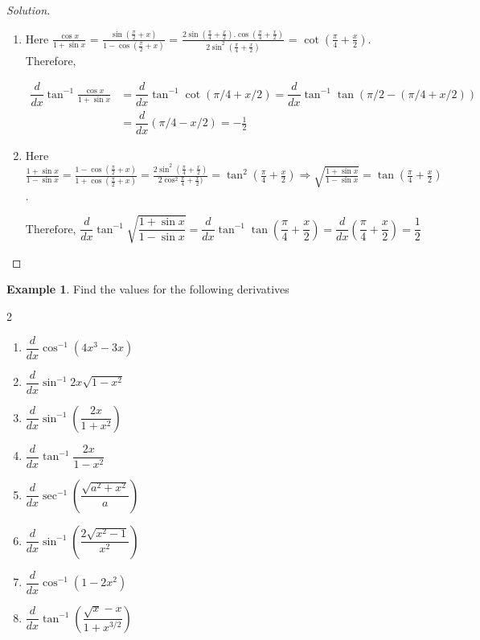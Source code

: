 \documentclass[../../main.tex]{subfiles}
\theoremstyle{definition}
\newtheorem{example}{Example}[section]
\newenvironment{solution}
    {\begin{proof}[Solution]}
    {\end{proof}}
\begin{document}
\begin{solution}
\begin{enumerate}[label=(\roman*)]
\item Here $\frac{\cos x}{1+\sin x}$ = $\frac{\sin (\frac{\pi}{2}+x)}{1-\cos(\frac{\pi}{2}+x)}$ = $\frac{2\sin (\frac{\pi}{4}+\frac{x}{2}).\cos (\frac{\pi}{4}+\frac{x}{2})}{2\sin^2(\frac{\pi}{4}+\frac{x}{2})}$ = $\cot (\frac{\pi}{4}+\frac{x}{2})$. Therefore,

\begin{align*}
\dfrac{d}{dx} \tan^{-1} \frac{\cos x}{1+\sin x} &= \dfrac{d}{dx} \tan^{-1}\cot (\pi/4+x/2) = \dfrac{d}{dx} \tan^{-1}\tan(\pi/2- (\pi/4+x/2)) \\ 
&= \dfrac{d}{dx} (\pi/4-x/2) = -\frac{1}{2}
\end{align*}


\item Here $\frac{1+\sin x}{1-\sin x} = \frac{1-\cos(\frac{\pi}{2}+ x)}{1+\cos (\frac{\pi}{2}+x)} = \frac{2\sin^2(\frac
{\pi}{4}+\frac{x}{2})}{2\cos^2\frac
{\pi}{4}+\frac{x}{2})} = \tan^2(\frac{\pi}{4}+\frac{x}{2}) \Rightarrow \sqrt{\frac{1+\sin x}{1-\sin x}} = \tan (\frac{\pi}{4}+\frac{x}{2})$. 

\[
\text{Therefore, }\dfrac{d}{dx} \tan ^{-1} \sqrt{\frac{1+\sin x}{1-\sin x}} = \dfrac{d}{dx}\tan ^{-1}\tan (\frac{\pi}{4}+\frac{x}{2}) = \dfrac{d}{dx}(\frac{\pi}{4}+\frac{x}{2}) = \frac{1}{2}
\]

\end{enumerate}
\end{solution}


\begin{example}
Find the values for the following derivatives 
\begin{multicols}{2}
\begin{enumerate}[label=(\roman*)]
    \item $\dfrac{d}{dx} \cos^{-1} (4x^3-3x)$
    \item $\dfrac{d}{dx} \sin^{-1} 2x\sqrt{1-x^2}$
    \item $\dfrac{d}{dx} \sin^{-1} (\dfrac{2x}{1+x^2})$ 
    \item $\dfrac{d}{dx} \tan^{-1} \dfrac{2x}{1-x^2}$
    \item $\dfrac{d}{dx} \sec^{-1} (\dfrac{\sqrt{a^2+x^2}}{a})$
    \item $\dfrac{d}{dx} \sin^{-1} (\dfrac{2\sqrt{x^2-1}}{x^2})$
    \item $\dfrac{d}{dx} \cos^{-1} (1-2x^2)$ 
    \item $\dfrac{d}{dx} \tan^{-1} (\dfrac{\sqrt{x}-x}{1+x^{3/2}})$   
\end{enumerate}
\end{multicols}
\end{example}
\end{document}
